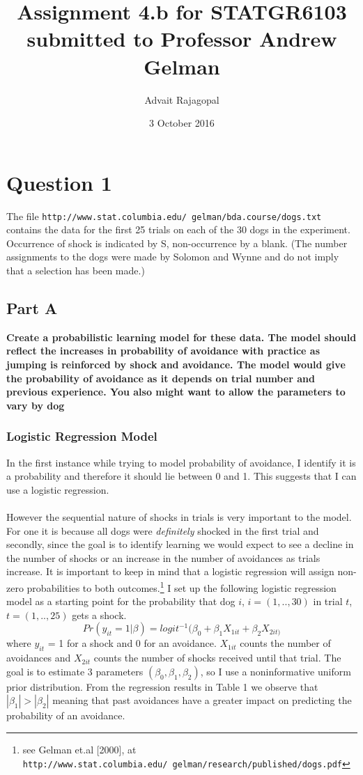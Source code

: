 \documentclass{article}
\title{Assignment 4.b for \textbf{STATGR6103}\\
\large submitted to Professor Andrew Gelman}
\date{3 October 2016}
\author{Advait Rajagopal}
\begin{document}
  \maketitle
\section{Question 1}
The file \texttt{http://www.stat.columbia.edu/~gelman/bda.course/dogs.txt} contains the data for the first 25 trials on each of the 30 dogs in the experiment. Occurrence of shock is indicated by S, non-occurrence by a blank. (The number assignments to the dogs were made by Solomon and Wynne and do not imply that a selection has been made.)
\subsection{Part A}
\textbf{Create a probabilistic learning model for these data. The model should reflect the increases in probability of avoidance with practice as jumping is reinforced by shock and avoidance. The model would give the probability of avoidance as it depends on trial number and previous experience. You also might want to allow the parameters to vary by dog}
\subsubsection{Logistic Regression Model}
In the first instance while trying to model probability of avoidance, I identify it is a probability and therefore it should lie between 0 and 1. This suggests that I can use a logistic regression. \\
\\
However the sequential nature of shocks in trials is very important to the model. For one it is because all dogs were \textit{definitely} shocked in the first trial and secondly, since the goal is to identify learning we would expect to see a decline in the number of shocks or an increase in the number of avoidances as trials increase. It is important to keep in mind that a logistic regression will assign non-zero probabilities to both outcomes.\footnote{see Gelman et.al [2000], at \texttt{http://www.stat.columbia.edu/~gelman/research/published/dogs.pdf}}
I set up the following logistic regression model as a starting point for the probability that dog $i$, $i = (1,..,30)$ in trial $t$, $t = (1,..,25)$ gets a shock.
$$Pr(y_{it} = 1|\beta) = logit^{-1}(\beta_0 + \beta_1 X_{1it} + \beta_2 X_{2it)}$$
where $y_{it}$ = 1 for a shock and 0 for an avoidance. $X_{1it}$ counts the number of avoidances and $X_{2it}$ counts the number of shocks received until that trial. The goal is to estimate 3 parameters $(\beta_0, \beta_1, \beta_2)$, so I use a noninformative uniform prior distribution. From the regression results in Table 1 we observe that $|\beta_1| > |\beta_2|$ meaning that past avoidances have a greater impact on predicting the probability of an avoidance.
\end{document}
